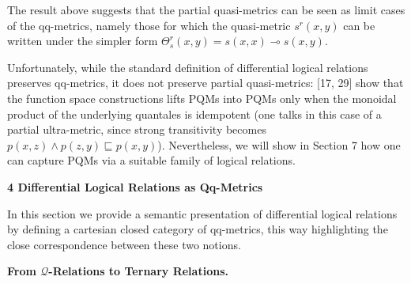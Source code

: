\documentclass[10pt,a4paper]{amsart}
\begin{document}
 
 
 
The result above suggests that the partial quasi-metrics can be seen as limit cases of the qq-metrics, namely those for which the quasi-metric $s^{r}(x,y)$ can be written under the simpler form $\Theta^{r}_{s}(x,y)=s(x,x)\multimap s(x,y)$.\par
 
 
 
Unfortunately, while the standard definition of differential logical relations preserves qq-metrics, it does not preserve partial quasi-metrics: [17, 29] show that the function space constructions lifts PQMs into PQMs only when the monoidal product of the underlying quantales is idempotent (one talks in this case of a partial ultra-metric, since strong transitivity becomes $p(x,z)\land p(z,y)\sqsubseteq p(x,y)$). Nevertheless, we will show in Section 7 how one can capture PQMs via a suitable family of logical relations.\par
 
 
 


 
\par\medskip\noindent\textbf{4 Differential Logical Relations as Qq-Metrics}\par
 
 
In this section we provide a semantic presentation of differential logical relations by defining a cartesian closed category of qq-metrics, this way highlighting the close correspondence between these two notions.\par
 
 
 
\par\medskip\noindent\textbf{From $\mathcal{Q}$-Relations to Ternary Relations.}\par
 
 
\end{document}
